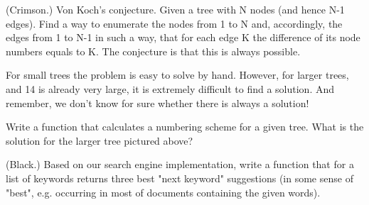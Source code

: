 \documentclass{article}
\begin{document}
\begin{exercise}
  (Crimson.) Von Koch's conjecture. Given a tree with N nodes (and hence N-1
  edges). Find a way to enumerate the nodes from 1 to N and, accordingly, the
  edges from 1 to N-1 in such a way, that for each edge K the difference of
  its node numbers equals to K. The conjecture is that this is always
  possible.
  
  For small trees the problem is easy to solve by hand. However, for larger
  trees, and 14 is already very large, it is extremely difficult to find a
  solution. And remember, we don't know for sure whether there is always a
  solution!
  
  Write a function that calculates a numbering scheme for a given tree. What
  is the solution for the larger tree pictured above?
\end{exercise}

\begin{exercise}
  (Black.) Based on our search engine implementation, write a function that
  for a list of keywords returns three best "next keyword" suggestions (in
  some sense of "best", e.g. occurring in most of documents containing the
  given words).
\end{exercise}

\
\end{document}
